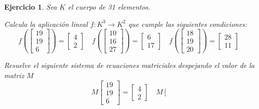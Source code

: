 \documentclass[12pt]{amsart}
\newtheorem{ejer}{Ejercicio}
\begin{document}


\begin{ejer} Sea $K$ el cuerpo de 31 elementos.
\newline
\noindent\begin{minipage}{\textwidth}
\begin{tcolorbox}[colback = green!20!white,title=Versión Aplicación]
Calcula la aplicaci\'on lineal $f:K^{3} \to K^{2}$ que cumple las siguientes condiciones: 
\[f\left(\left[\begin{array}{r}
19 \\
19 \\
6
\end{array}\right]\right) = \left[\begin{array}{r}
4 \\
2
\end{array}\right] \quad f\left(\left[\begin{array}{r}
10 \\
16 \\
27
\end{array}\right]\right) = \left[\begin{array}{r}
6 \\
17
\end{array}\right] \quad f\left(\left[\begin{array}{r}
18 \\
19 \\
20
\end{array}\right]\right) = \left[\begin{array}{r}
28 \\
11
\end{array}\right] \quad 
\]\end{tcolorbox}
\end{minipage} \newline
\noindent\begin{minipage}{\textwidth}
\begin{tcolorbox}[colback = blue!20!white,title=Versión Sistema Matricial]
Resuelve el siguiente sistema de ecuaciones matriciales despejando el valor de la matriz $M$
\[M \left[\begin{array}{r}
19 \\
19 \\
6
\end{array}\right] = \left[\begin{array}{r}
4 \\
2
\end{array}\right] \quad M \left[\begin{array}{r}

\end{array}\]
\end{tcolorbox}
\end{minipage}
\end{ejer}
\end{document}
